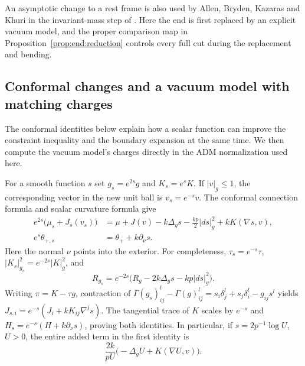 An asymptotic change to a rest frame is also used by Allen, Bryden,
Kazaras and Khuri in the invariant-mass step of
\cite[Section~5]{AllenBrydenKazarasKhuri2025}. Here the end is first
replaced by an explicit vacuum model, and the proper comparison map in
Proposition~\ref{prop:end:reduction} controls every full cut during
the replacement and bending.

\subsection{Conformal changes and a vacuum model with matching charges}

The conformal identities below explain how a scalar function can
improve the constraint inequality and the boundary expansion at the
same time.  We then compute the vacuum model's charges directly in
the ADM normalization used here.

For a smooth function $s$ set $g_s=e^{2s}g$ and $K_s=e^sK$.
If $|v|_g\le1$, the corresponding vector in the new unit ball is
$v_s=e^{-s}v$.  The conformal connection formula and scalar curvature
formula give
\begin{equation}\label{eq:end:conformal}
\begin{aligned}
 e^{2s}\bigl(\mu_s+J_s(v_s)\bigr)
 &=\mu+J(v)-k\Delta_gs-\frac{kp}{2}|ds|_g^2
                  +kK(\nabla s,v),\\
 e^s\theta_{+,s}&=\theta_++k\partial_\nu s.
\end{aligned}
\end{equation}
Here the normal $\nu$ points into the exterior.  For completeness,
$\tau_s=e^{-s}\tau$, $|K_s|_{g_s}^2=e^{-2s}|K|_g^2$, and
\[
 R_{g_s}=e^{-2s}\bigl(R_g-2k\Delta_gs-kp|ds|_g^2\bigr).
\]
Writing $\pi=K-\tau g$, contraction of
$\Gamma(g_s)^l_{ij}-\Gamma(g)^l_{ij}
=s_i\delta_j^l+s_j\delta_i^l-g_{ij}s^l$ yields
$J_{s,i}=e^{-s}(J_i+kK_{ij}\nabla^js)$.
The tangential trace of $K$ scales by $e^{-s}$ and
$H_s=e^{-s}(H+k\partial_\nu s)$, proving both identities.
In particular, if $s=2p^{-1}\log U$, $U>0$, the entire added term
in the first identity is
\begin{equation}\label{eq:end:conformal-U}
 \frac{2k}{pU}\bigl(-\Delta_gU+K(\nabla U,v)\bigr).
\end{equation}

